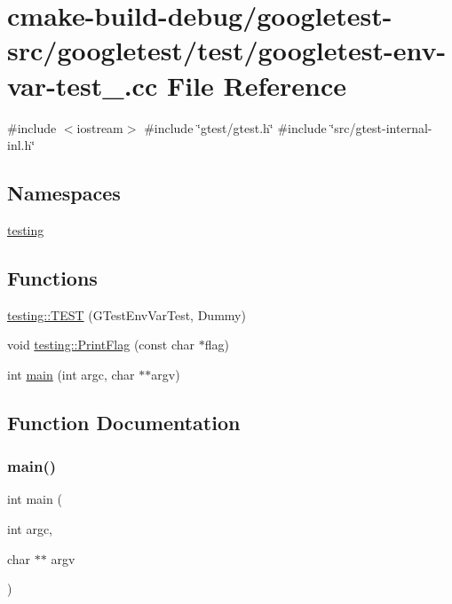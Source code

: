 \hypertarget{googletest-env-var-test___8cc}{}\section{cmake-\/build-\/debug/googletest-\/src/googletest/test/googletest-\/env-\/var-\/test\+\_\+.cc File Reference}
\label{googletest-env-var-test___8cc}
{\ttfamily \#include $<$iostream$>$}\newline
{\ttfamily \#include \char`\"{}gtest/gtest.\+h\char`\"{}}\newline
{\ttfamily \#include \char`\"{}src/gtest-\/internal-\/inl.\+h\char`\"{}}\newline
\subsection*{Namespaces}
\begin{DoxyCompactItemize}
\item 
 \mbox{\hyperlink{namespacetesting}{testing}}
\end{DoxyCompactItemize}
\subsection*{Functions}
\begin{DoxyCompactItemize}
\item 
\mbox{\hyperlink{namespacetesting_af4187d1b48a2812f1335721ed8f30a99}{testing\+::\+T\+E\+ST}} (G\+Test\+Env\+Var\+Test, Dummy)
\item 
void \mbox{\hyperlink{namespacetesting_a9863402455bfcf9be5fc0b1453a6d97d}{testing\+::\+Print\+Flag}} (const char $\ast$flag)
\item 
int \mbox{\hyperlink{googletest-env-var-test___8cc_a3c04138a5bfe5d72780bb7e82a18e627}{main}} (int argc, char $\ast$$\ast$argv)
\end{DoxyCompactItemize}


\subsection{Function Documentation}
\mbox{\label{googletest-env-var-test___8cc_a3c04138a5bfe5d72780bb7e82a18e627}} 
\subsubsection{\texorpdfstring{main()}{main()}}
{\footnotesize\ttfamily int main (\begin{DoxyParamCaption}\item[{int}]{argc,  }\item[{char $\ast$$\ast$}]{argv }\end{DoxyParamCaption})}

